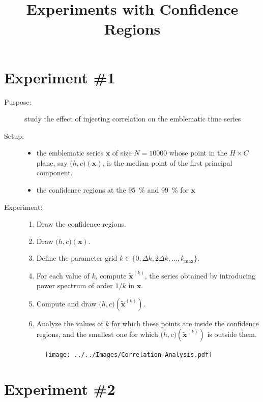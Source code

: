 \documentclass[12pt]{article}
\title{Experiments with Confidence Regions}
\author{}
\date{}
\begin{document}
\section{Experiment \#1}

\begin{description}
	\item[Purpose:] study the effect of injecting correlation on the emblematic time series
	\item[Setup:]\mbox{} 
		\begin{itemize}
			\item the emblematic series $\bm x$ of size $N=\num{10000}$ whose point in the $H\times C$ plane, say $\big(h, c\big)(\bm x)$, is the median point of the first principal component.
			\item the confidence regions at the \SI{95}{\percent} and \SI{99}{\percent} for $\bm x$
		\end{itemize}
	\item[Experiment:] \mbox{}
		\begin{enumerate}
			\item Draw the confidence regions.
			\item Draw $\big(h,c\big)(\bm x)$.
			\item Define the parameter grid $k\in\{0,\Delta k, 2\Delta k,\dots, k_{\max}\}$.
			\item For each value of $k$, compute $\widetilde{\bm x}^{(k)}$, the series obtained by introducing power spectrum of order $1/k$ in $\bm x$.
			\item Compute and draw $\big(h,c\big)(\widetilde{\bm x}^{(k)})$.
			\item Analyze the values of $k$ for which these points are inside the confidence regions, and the smallest one for which $\big(h,c\big)(\widetilde{\bm x}^{(k)})$ is outside them.
		\end{enumerate}
	
	\begin{figure}[H]
		\texttt{[image: ../../Images/Correlation-Analysis.pdf]}
	\end{figure}
\end{description}

\section{Experiment \#2}
\end{document}
